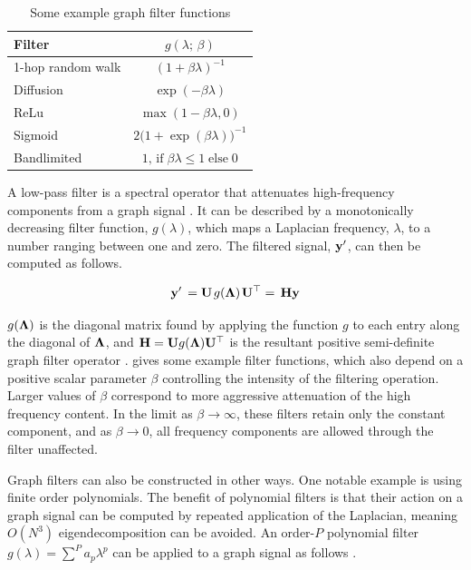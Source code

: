 \begin{table}
    \centering
    \def\arraystretch{1.7}
    \begin{tabular}{@{}l c@{}}
        \toprule
        \textbf{Filter}   & $g(\lambda; \,\beta)$   \\
        \midrule
        1-hop random walk & $(1 + \beta \lambda)^{-1}$ \\
        Diffusion         & $\exp(-\beta \lambda)$\\
        ReLu              & $\max (1 - \beta \lambda, 0)$\\
        Sigmoid           & $2 \big( 1 + \exp(\beta \lambda)\big)^{-1}$\\
        Bandlimited       & $1, \,\text{if} \; \beta \lambda \leq 1 \; \text{else} \; 0$ \\
        \bottomrule
       \end{tabular}
       \caption[Example graph filter functions]{Some example graph filter functions}
        \label{tab:filters}
\end{table}

A low-pass filter is a spectral operator that attenuates high-frequency components from a graph signal \citep{Ricaud2019}. It can be described by a monotonically decreasing filter function, $g(\lambda)$, which maps a Laplacian frequency, $\lambda$, to a number ranging between one and zero. The filtered signal, $\mathbf{y}'$, can then be computed as follows. 


\begin{equation}
    \mathbf{y}' \, =\mathbf{U} \mkern 2mu g(\mathbf{\Lambda}) \mkern 2mu \mathbf{U}^\top = \, \mathbf{H} \mathbf{y}
\end{equation}


$g(\mathbf{\Lambda})$ is the diagonal matrix found by applying the function $g$ to each entry along the diagonal of $\mathbf{\Lambda}$, and $\mathbf{H} = \mathbf{U} g(\mathbf{\Lambda}) \mathbf{U}^\top$ is the resultant positive semi-definite graph filter operator \citep{Isufi2022}.  gives some example filter functions, which also depend on a positive scalar parameter $\beta$ controlling the intensity of the filtering operation. Larger values of $\beta$ correspond to more aggressive attenuation of the high frequency content. In the limit as $\beta \rightarrow \infty$, these filters retain only the constant component, and as $\beta \rightarrow 0$, all frequency components are allowed through the filter unaffected. 

Graph filters can also be constructed in other ways. One notable example is using finite order polynomials. The benefit of polynomial filters is that their action on a graph signal can be computed by repeated application of the Laplacian, meaning $O(N^3)$ eigendecomposition can be avoided. An order-$P$ polynomial filter $g(\lambda) = \sum^P a_p \lambda^p$ can be applied to a graph signal as follows \citep{Susnjara2015}. 


